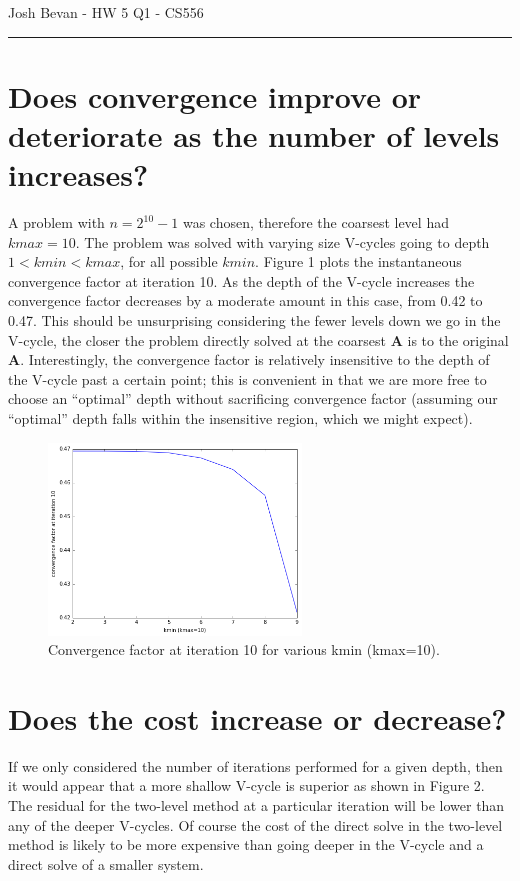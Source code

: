 \documentclass[letterpaper,10pt]{article}
\begin{document}
\begin{flushright}
{\Large Josh Bevan - HW 5 Q1 - CS556}
\end{flushright}
\vskip -0.1in
\hrule
\vskip 0.3in

\section*{Does convergence improve or deteriorate as the number of levels increases?}
A problem with $n=2^{10}-1$ was chosen, therefore the coarsest level had $kmax=10$. The problem was solved with varying size V-cycles going to depth $1<kmin<kmax$, for all possible $kmin$. Figure 1 plots the instantaneous convergence factor at iteration 10. As the depth of the V-cycle increases the convergence factor decreases by a moderate amount in this case, from 0.42 to 0.47. This should be unsurprising considering the fewer levels down we go in the V-cycle, the closer the problem directly solved at the coarsest $\mathbf{A}$ is to the original $\mathbf{A}$. Interestingly, the convergence factor is relatively insensitive to the depth of the V-cycle past a certain point; this is convenient in that we are more free to choose an ``optimal'' depth without sacrificing convergence factor (assuming our ``optimal'' depth falls within the insensitive region, which we might expect).

\begin{figure}[!htb]
\centering
\includegraphics[width=0.6\textwidth]{cnvg.PNG}
\caption{Convergence factor at iteration 10 for various kmin (kmax=10).}
\end{figure}

\section*{Does the cost increase or decrease?}
If we only considered the number of iterations performed for a given depth, then it would appear that a more shallow V-cycle is superior as shown in Figure 2. The residual for the two-level method at a particular iteration will be lower than any of the deeper V-cycles. Of course the cost of the direct solve in the two-level method is likely to be more expensive than going deeper in the V-cycle and a direct solve of a smaller system.
\end{document}
